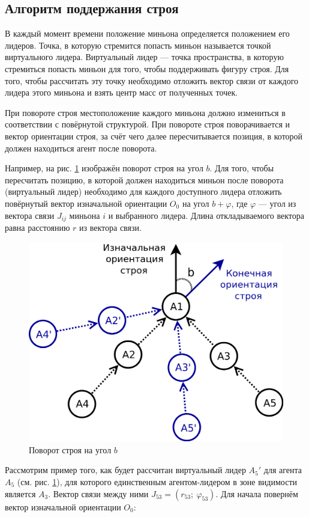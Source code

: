 \documentclass[a4paper, 14pt]{extarticle}
\let\Oldsubsection\subsection
\renewcommand{\subsection}{\FloatBarrier\Oldsubsection}
\begin{document}
\subsection{Алгоритм поддержания строя}
В каждый момент времени положение миньона определяется положением его лидеров. Точка, в которую стремится попасть миньон называется точкой виртуального лидера. Виртуальный лидер — точка пространства, в которую стремиться попасть миньон для того, чтобы поддерживать фигуру строя. Для того, чтобы рассчитать эту точку необходимо отложить вектор связи от каждого лидера этого миньона и взять центр масс от полученных точек.\par
При повороте строя местоположение каждого миньона должно измениться в соответствии с повёрнутой структурой. При повороте строя поворачивается и вектор ориентации строя, за счёт чего далее пересчитывается позиция, в которой должен находиться агент после поворота. \par
Например, на рис. \ref{fig:wedge-platoon-rotation} изображён поворот строя на угол $b$. Для того, чтобы пересчитать позицию, в которой должен находиться миньон после поворота (виртуальный лидер) необходимо для каждого доступного лидера отложить повёрнутый вектор изначальной ориентации $O_{0}$ на угол $b + \varphi$, где $\varphi$ — угол из вектора связи $J_{ij}$ миньона $i$ и выбранного лидера. Длина откладываемого вектора равна расстоянию $r$ из вектора связи. 
\par
\begin{figure}[!htbp]
	\centering
	\includegraphics[width=0.5\linewidth]{platoon/wedge-platoon-rotation}
	\caption{Поворот строя на угол $b$}
	\label{fig:wedge-platoon-rotation}
\end{figure}
Рассмотрим пример того, как будет рассчитан виртуальный лидер $A_5'$ для агента $A_5$ (см. рис. \ref{fig:wedge-platoon-rotation}), для которого единственным агентом-лидером в зоне видимости является $A_3$. Вектор связи между ними $J_{53} = (r_{53}; \ \varphi_{53})$. Для начала повернём вектор изначальной ориентации $O_{0}$:\par
\end{document}
